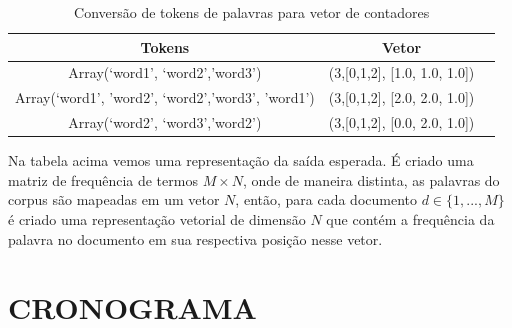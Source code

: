 \documentclass[12pt,a4paper]{article}
\begin{document}
  
  \begin{table}[h]
    \centering
    \begin{tabular}{c c c}
    Tokens		&Vetor &\\
    \hline
    Array(‘word1’, ‘word2’,’word3’)						&(3,[0,1,2], [1.0, 1.0, 1.0]) &\\
    Array(‘word1’, ’word2’, ‘word2’,’word3’, ’word1’)		&(3,[0,1,2], [2.0, 2.0, 1.0]) &\\
    Array(‘word2’, ‘word3’,’word2’)						&(3,[0,1,2], [0.0, 2.0, 1.0]) &\\
    \hline
    \end{tabular}
    \caption{Conversão de tokens de palavras para vetor de contadores}
  \end{table}
  
  
  Na tabela acima vemos uma representação da saída esperada. É criado uma matriz de frequência de termos $M \times N$, onde de maneira distinta, as palavras do corpus são mapeadas em um vetor $N$, então, para cada documento $d \in \{1,. . . , M\}$ é criado uma representação vetorial de dimensão $N$ que contém a frequência da palavra no documento em sua respectiva posição nesse vetor.
  
  
  \section{CRONOGRAMA}
  
  \def\refname{REFERÊNCIAS BIBLIOGRÁFICAS}
  
  
  
  
\end{document}
